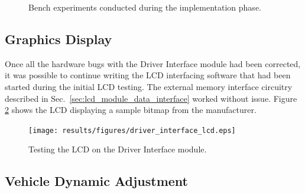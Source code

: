\begin{figure}[h!]
\centering
{}
\caption{Bench experiments conducted during the implementation phase.}
\label{fig:bench_experiments}
\end{figure}

\subsection{Graphics Display}

Once all the hardware bugs with the Driver Interface module had been corrected, it was possible to continue writing the LCD interfacing software that had been started during the initial LCD testing. The external memory interface circuitry described in Sec.\ \ref{sec:lcd_module_data_interface} worked without issue. Figure \ref{fig:driver_interface_lcd} shows the LCD displaying a sample bitmap from the manufacturer.

\begin{figure}[h!]
 \centering
 \texttt{[image: results/figures/driver\_interface\_lcd.eps]}
 \caption{Testing the LCD on the Driver Interface module.}
 \label{fig:driver_interface_lcd}
\end{figure}

\subsection{Vehicle Dynamic Adjustment}

